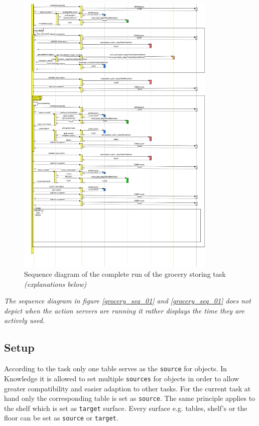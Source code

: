 \documentclass[main.tex]{subfiles}
\begin{document}
		\begin{figure}[H]
			\centering
			\includegraphics[width=0.85\textwidth]{pictures/diagramms/second-part-grocery-sequence.png}
			\caption{Sequence diagram of the complete run of the grocery storing task \textit{(explanations below)}}
			\label{grocery_seq_02}
		\end{figure}
		\textit{The sequence diagram in figure \ref{grocery_seq_01} and \ref{grocery_seq_01} does not depict when the action servers are running it rather displays the time they are actively used.}
	
	\subsection{Setup}
	

	According to the task only one table serves as the \texttt{source} for objects. In Knowledge it is allowed to set multiple \texttt{sources} for objects in order to allow greater compatibility and easier adaption to other tasks. For the current task at hand only the corresponding table is set as \texttt{source}. The same principle applies to the shelf which is set as \texttt{target} surface. Every surface e.g. tables, shelf's or the floor can be set as \texttt{source} or \texttt{target}.
	
\end{document}
